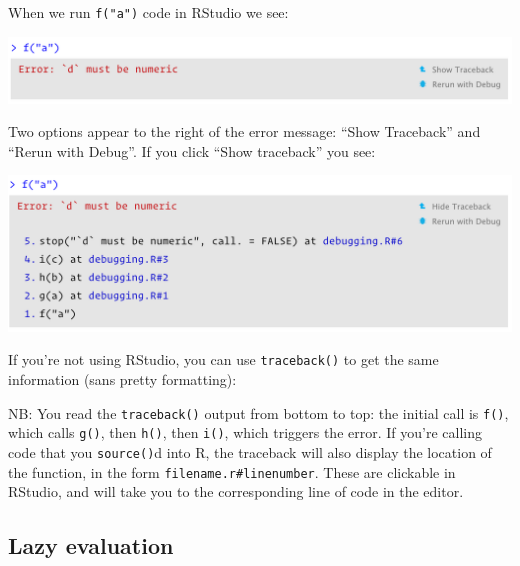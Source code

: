 \documentclass[]{book}
\newenvironment{Shaded}{\begin{snugshade}}{\end{snugshade}}
\newcommand{\CommentTok}[1]{\textcolor[rgb]{0.37,0.37,0.37}{\textit{#1}}}
\newcommand{\KeywordTok}[1]{\textcolor[rgb]{0.27,0.27,0.27}{\textbf{#1}}}
\newcommand{\NormalTok}[1]{#1}
\begin{document}
When we run \texttt{f("a")} code in RStudio we see:

\begin{center}\includegraphics[width=1\linewidth]{screenshots/debugging/rstudio-error} \end{center}

Two options appear to the right of the error message: ``Show Traceback'' and ``Rerun with Debug''. If you click ``Show traceback'' you see:

\begin{center}\includegraphics[width=1\linewidth]{screenshots/debugging/rstudio-traceback} \end{center}

If you're not using RStudio, you can use \texttt{traceback()} to get the same information (sans pretty formatting):

\begin{Shaded}
\end{Shaded}

NB: You read the \texttt{traceback()} output from bottom to top: the initial call is \texttt{f()}, which calls \texttt{g()}, then \texttt{h()}, then \texttt{i()}, which triggers the error. If you're calling code that you \texttt{source()}d into R, the traceback will also display the location of the function, in the form \texttt{filename.r\#linenumber}. These are clickable in RStudio, and will take you to the corresponding line of code in the editor.

\hypertarget{debug-lazy}{%
\subsection{Lazy evaluation}\label{debug-lazy}}
\end{document}
